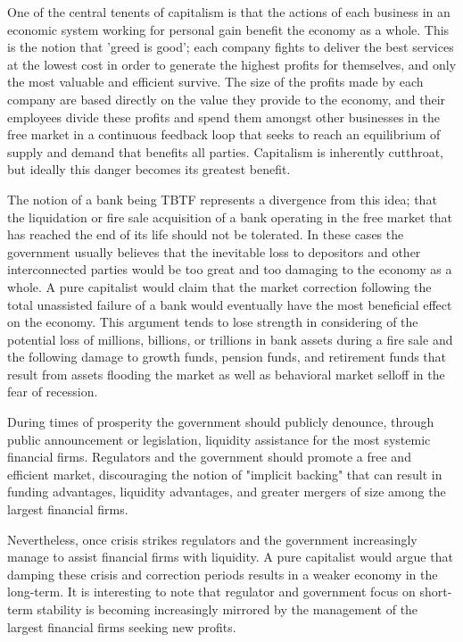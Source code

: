 One of the central tenents of capitalism is that the actions of each business in an economic system working for personal gain benefit the economy as a whole. This is the notion that 'greed is good'; each company fights to deliver the best services at the lowest cost in order to generate the highest profits for themselves, and only the most valuable and efficient survive. The size of the profits made by each company are based directly on the value they provide to the economy, and their employees divide these profits and spend them amongst other businesses in the free market in a continuous feedback loop that seeks to reach an equilibrium of supply and demand that benefits all parties. Capitalism is inherently cutthroat, but ideally this danger becomes its greatest benefit.

The notion of a bank being TBTF represents a divergence from this idea; that the liquidation or fire sale acquisition of a bank operating in the free market that has reached the end of its life should not be tolerated.\cite{Baker} In these cases the government usually believes that the inevitable loss to depositors and other interconnected parties would be too great and too damaging to the economy as a whole. A pure capitalist would claim that the market correction following the total unassisted failure of a bank would eventually have the most beneficial effect on the economy. This argument tends to lose strength in considering of the potential loss of millions, billions, or trillions in bank assets during a fire sale and the following damage to growth funds, pension funds, and retirement funds that result from assets flooding the market as well as behavioral market selloff in the fear of recession.\cite{Kaufman}

During times of prosperity the government should publicly denounce, through public announcement or legislation, liquidity assistance for the most systemic financial firms. Regulators and the government should promote a free and efficient market, discouraging the notion of "implicit backing" that can result in funding advantages, liquidity advantages, and greater mergers of size among the largest financial firms\cite{Baker}\cite{Brewer}\cite{Rime}\cite{Strongin}. 

Nevertheless, once crisis strikes regulators and the government increasingly manage to assist financial firms with liquidity. A pure capitalist would argue that damping these crisis and correction periods results in a weaker economy in the long-term. It is interesting to note that regulator and government focus on short-term stability is becoming increasingly mirrored by the management of the largest financial firms seeking new profits.  

